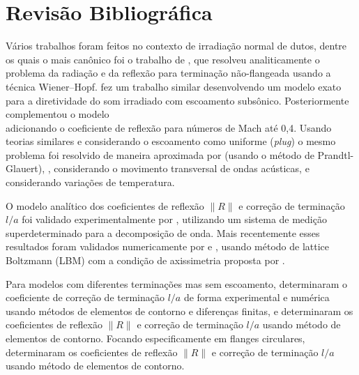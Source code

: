 \section{Revisão Bibliográfica}
\label{chapter:revisao}

Vários trabalhos foram feitos no contexto de irradiação normal de dutos, dentre os quais o mais canônico foi o trabalho de , que resolveu analiticamente o problema da radiação e da reflexão para terminação não-flangeada usando a técnica Wiener–Hopf.  fez um trabalho similar desenvolvendo um modelo exato para a diretividade do som irradiado com escoamento subsônico. Posteriormente  complementou o modelo \\ adicionando o coeficiente de reflexão para números de Mach até 0,4. Usando teorias similares e considerando o escoamento como uniforme (\textit{plug}) o mesmo problema foi resolvido de maneira aproximada por   (usando o método de Prandtl-Glauert), , considerando o movimento transversal de ondas acústicas, e  considerando variações de temperatura. 

O modelo analítico \cite{munt1990acoustic} dos coeficientes de reflexão $\|R\|$ e correção de terminação $l/a$ foi validado experimentalmente por , utilizando um sistema de medição superdeterminado para a decomposição de onda. Mais recentemente esses resultados foram validados numericamente por  e , usando método de lattice Boltzmann (LBM) com a condição de axissimetria proposta por . 

Para modelos com diferentes terminações mas sem escoamento,  determinaram o coeficiente de correção de terminação $l/a$ de forma experimental e numérica usando métodos de elementos de contorno e diferenças finitas, e  determinaram os coeficientes de reflexão $\|R\|$ e correção de terminação $l/a$ usando método de elementos de contorno. Focando especificamente em flanges circulares,  determinaram os coeficientes de reflexão $\|R\|$ e correção de terminação $l/a$ usando método de elementos de contorno.


